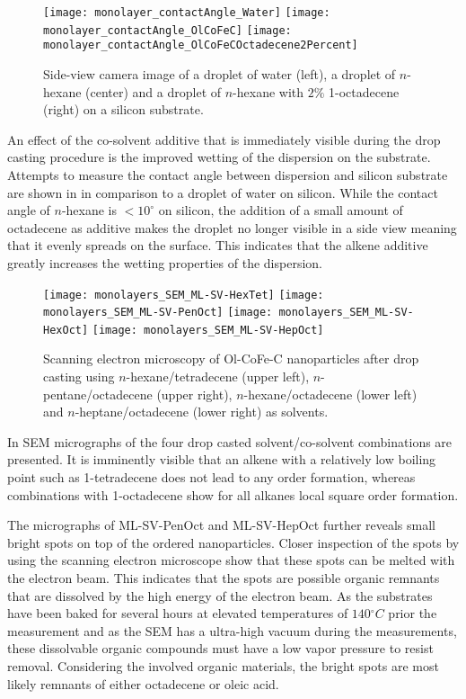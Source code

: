 \documentclass[\main/dresen_thesis.tex]{subfiles}
\begin{document}
    \begin{figure}[tb]
      \centering
      \texttt{[image: monolayer\_contactAngle\_Water]}
      \texttt{[image: monolayer\_contactAngle\_OlCoFeC]}
      \texttt{[image: monolayer\_contactAngle\_OlCoFeCOctadecene2Percent]}
      \caption{\label{fig:monolayers:preparation:contactAngle}Side-view camera image of a droplet of water (left), a droplet of $\mathit{n}$-hexane (center) and a droplet of $\mathit{n}$-hexane with $2 \unit{\%}$ 1-octadecene (right) on a silicon substrate.}
    \end{figure}
    An effect of the co-solvent additive that is immediately visible during the drop casting procedure is the improved wetting of the dispersion on the substrate.
    Attempts to measure the contact angle between dispersion and silicon substrate are shown in  in comparison to a droplet of water on silicon.
    While the contact angle of $\mathit{n}$-hexane is $<10^\circ$ on silicon, the addition of a small amount of octadecene as additive makes the droplet no longer visible in a side view meaning that it evenly spreads on the surface.
    This indicates that the alkene additive greatly increases the wetting properties of the dispersion.

    \begin{figure}[tb]
      \centering
      \texttt{[image: monolayers\_SEM\_ML-SV-HexTet]}
      \texttt{[image: monolayers\_SEM\_ML-SV-PenOct]}
      \texttt{[image: monolayers\_SEM\_ML-SV-HexOct]}
      \texttt{[image: monolayers\_SEM\_ML-SV-HepOct]}
      \caption{\label{fig:monolayers:preparation:solventVariation:sem}Scanning electron microscopy of Ol-CoFe-C nanoparticles after drop casting using $\mathit{n}$-hexane/tetradecene (upper left), $\mathit{n}$-pentane/octadecene (upper right), $\mathit{n}$-hexane/octadecene (lower left) and $\mathit{n}$-heptane/octadecene (lower right) as solvents.}
    \end{figure}
    In  SEM micrographs of the four drop casted solvent/co-solvent combinations are presented.
    It is imminently visible that an alkene with a relatively low boiling point such as 1-tetradecene does not lead to any order formation, whereas  combinations with 1-octadecene show for all alkanes local square order formation.

    The micrographs of ML-SV-PenOct and ML-SV-HepOct further reveals small bright spots on top of the ordered nanoparticles.
    Closer inspection of the spots by using the scanning electron microscope show that these spots can be melted with the electron beam.
    This indicates that the spots are possible organic remnants that are dissolved by the high energy of the electron beam.
    As the substrates have been baked for several hours at elevated temperatures of $140 \unit{^\circ C}$ prior the measurement and as the SEM has a ultra-high vacuum during the measurements, these dissolvable organic compounds must have a low vapor pressure to resist removal.
    Considering the involved organic materials, the bright spots are most likely remnants of either octadecene or oleic acid.
\end{document}
